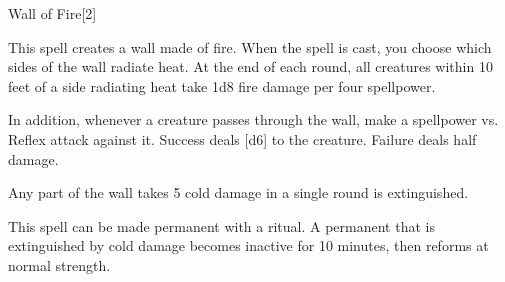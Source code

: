 \begin{spellsection}{Wall of Fire}[2]
    \begin{spellheader}
    \end{spellheader}
    \begin{spellcontent}
        \begin{spelltargetinginfo}
        \end{spelltargetinginfo}
        \begin{spelleffects}
            \spelleffect This spell creates a wall made of fire.
            When the spell is cast, you choose which sides of the wall radiate heat.
            At the end of each round, all creatures within 10 feet of a side radiating heat take 1d8 fire damage per four spellpower.

            In addition, whenever a creature passes through the wall, make a spellpower vs. Reflex attack against it.
            Success deals [d6] to the creature.
            Failure deals half damage.
            \spelldur \durshort
        \end{spelleffects}
    \end{spellcontent}
    \begin{spellfooter}
        \spellnotes Any part of the wall takes 5 cold damage in a single round is extinguished.

        This spell can be made permanent with a  ritual. A permanent  that is extinguished by cold damage becomes inactive for 10 minutes, then reforms at normal strength.
        \miscastexplode
    \end{spellfooter}
\end{spellsection}

